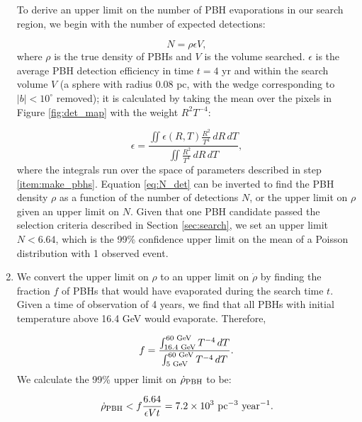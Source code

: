 \begin{enumerate}
\label{step:eff}
To derive an upper limit on the number of PBH evaporations in our search region, we begin with the number of expected detections:

\noindent
\begin{equation}
\label{eq:N_det}
N = \rho \epsilon V,
\end{equation}
where $\rho$ is the true density of PBHs and $V$ is the volume searched.
$\epsilon$ is the average PBH detection efficiency in time $t = 4$ yr and within the search volume $V$ (a sphere with radius 0.08 pc, with the wedge corresponding to $|b|<10^\circ$ removed); 
it is calculated by taking the mean over the pixels in Figure \ref{fig:det_map} with the weight $R^2 T^{-4}$:


\noindent
\begin{equation}
\epsilon = \frac{\iint \epsilon (R, T) \frac{R^2}{T^4} \,dR\,dT }{\iint \frac{R^2}{T^4}\,dR\,dT },
\end{equation}
where the integrals run over the space of parameters described in step \ref{item:make_pbhs}. 
Equation \ref{eq:N_det} can be inverted to find the PBH density $\rho$ as a function of the number of detections $N$, or the upper limit on $\rho$ given an upper limit on $N$. Given that one PBH candidate passed the selection criteria described in Section \ref{sec:search}, we set an upper limit $N < 6.64$, 
which is the 99\% confidence upper limit on the mean of a Poisson distribution with 1 observed event.

\item
\label{item:limit}
We convert the upper limit on $\rho$ to an upper limit on $\dot{\rho}$ by finding the fraction $f$ of PBHs that would have evaporated during the search time 
$t$. 
Given a time of observation of 4 years, we find that all PBHs with initial temperature above 16.4 GeV would evaporate. Therefore,

\noindent
\begin{equation}
f = \frac{\int_{\textup{16.4 GeV}}^{\textup{60 GeV}} T^{-4} \,dT}{\int_{\textup{5 GeV}}^{\textup{60 GeV}} T^{-4} \,dT}.
\end{equation}
We calculate the 99\% upper limit on $\dot{\rho}_{\rm PBH}$ to be:

\noindent
\begin{equation}
\dot{\rho}_{\rm PBH} < f\frac{6.64}{\epsilon V t} = 7.2 \times 10^3 \textup{ pc}^{-3} \textup{ year}^{-1}.
\end{equation}


\end{enumerate}
